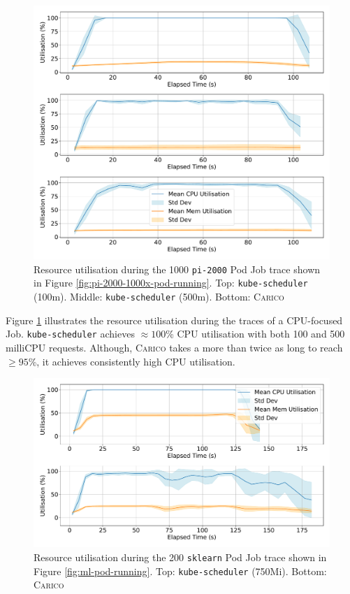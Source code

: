 \begin{figure}[ht!]
    \centering
    \includegraphics[width=\textwidth]{images/pi-util.pdf}
    \caption{Resource utilisation during the 1000 \texttt{pi-2000} Pod
    Job trace shown in Figure \ref{fig:pi-2000-1000x-pod-running}. Top:
    \texttt{kube-scheduler} (100m). Middle: \texttt{kube-scheduler} (500m).
    Bottom: \textsc{Carico}}
    \label{fig:pi-2000-1000x-pod-util}
\end{figure}

Figure \ref{fig:pi-2000-1000x-pod-util} illustrates the resource utilisation
during the traces of a CPU-focused Job. \texttt{kube-scheduler} achieves
$\approx100$\% CPU utilisation with both 100 and 500 milliCPU requests.
Although, \textsc{Carico} takes a more than twice as long to reach $\geq 95$\%,
it achieves consistently high CPU utilisation.

\begin{figure}[ht!]
    \centering
    \includegraphics[width=\textwidth]{images/ml-util.pdf}
    \caption{Resource utilisation during the 200 \texttt{sklearn} Pod
    Job trace shown in Figure \ref{fig:ml-pod-running}. Top:
    \texttt{kube-scheduler} (750Mi). Bottom: \textsc{Carico}}
    \label{fig:ml-util}
\end{figure}

